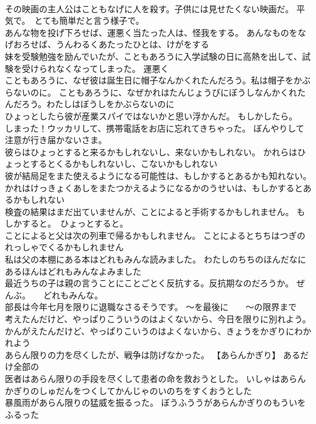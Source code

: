 \documentclass[8pt]{extreport}
\begin{document}
\begin{CJK}{UTF8}{min}
\\	その映画の主人公はこともなげに人を殺す。子供には見せたくない映画だ。	平気で。　とても簡単だと言う様子で。
\\	あんな物を投げ下ろせば、運悪く当たった人は、怪我をする。	あんなものをなげおろせば、うんわるくあたったひとは、けがをする 
\\	妹を受験勉強を励んでいたが、こともあろうに入学試験の日に高熱を出して、試験を受けられなくなってしまった。	運悪く
\\	こともあろうに、なぜ彼は誕生日に帽子なんかくれたんだろう。私は帽子をかぶらないのに。	こともあろうに、なぜかれはたんじょうびにぼうしなんかくれたんだろう。わたしはぼうしをかぶらないのに 
\\	ひょっとしたら彼が産業スパイではないかと思い浮かんだ。	もしかしたら。
\\	しまった！ウッカリして、携帯電話をお店に忘れてきちゃった。	ぼんやりして注意が行き届かないさま。
\\	彼らはひょっとすると来るかもしれないし、来ないかもしれない。	かれらはひょっとするとくるかもしれないし、こないかもしれない 
\\	彼が結局足をまた使えるようになる可能性は、もしかするとあるかも知れない。	かれはけっきょくあしをまたつかえるようになるかのうせいは、もしかするとあるかもしれない 
\\	検査の結果はまだ出ていませんが、ことによると手術するかもしれません。	もしかすると。　ひょっとすると。
\\	ことによると父は次の列車で帰るかもしれません。	ことによるとちちはつぎのれっしゃでくるかもしれません 
\\	私は父の本棚にある本はどれもみんな読みました。	わたしのちちのほんだなにあるほんはどれもみんなよみました 
\\	最近うちの子は親の言うことにことごとく反抗する。反抗期なのだろうか。	ぜんぶ。　　どれもみんな。
\\	部長は今年七月を限りに退職なさるそうです。	～を最後に　　～の限界まで
\\	考えたんだけど、やっぱりこういうのはよくないから、今日を限りに別れよう。	かんがえたんだけど、やっぱりこいうのはよくないから、きょうをかぎりにわかれよう 
\\	あらん限りの力を尽くしたが、戦争は防げなかった。	【あらんかぎり】 あるだけ全部の
\\	医者はあらん限りの手段を尽くして患者の命を救おうとした。	いしゃはあらんかぎりのしゅだんをつくしてかんじゃのいのちをすくおうとした 
\\	暴風雨があらん限りの猛威を振るった。	ぼうふううがあらんかぎりのもういをふるった 

\end{CJK}
\end{document}
